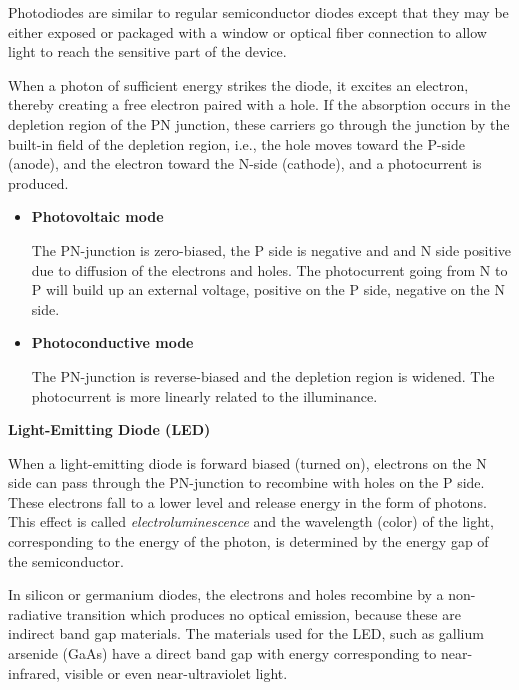 Photodiodes are similar to regular semiconductor diodes except that they 
may be either exposed or packaged with a window or optical fiber connection
to allow light to reach the sensitive part of the device. 

When a photon of sufficient energy strikes the diode, it excites an electron,
thereby creating a free electron paired with a hole. If the absorption occurs 
in the depletion region of the PN junction, these carriers go through the 
junction by the built-in field of the depletion region, i.e., the hole moves
toward the P-side (anode), and the electron toward the N-side (cathode), and
a photocurrent is produced.

\begin{itemize}
\item {\bf Photovoltaic mode}
  
  The PN-junction is zero-biased, the P side is negative and and N side positive 
  due to diffusion of the electrons and holes. The photocurrent going from N to P
  will build up an external voltage, positive on the P side, negative on the N
  side.
\item {\bf Photoconductive mode}

  The PN-junction is reverse-biased and the depletion region is widened. The 
  photocurrent is more linearly related to the illuminance.

\end{itemize} 


{\bf Light-Emitting Diode (LED)}

When a light-emitting diode is forward biased (turned on), electrons on the N side
can pass through the PN-junction to recombine with holes on the P side. These 
electrons fall to a lower level and release energy in the form of photons. This 
effect is called {\em electroluminescence} and the wavelength (color) of the light,
corresponding to the energy of the photon, is determined by the energy gap of the 
semiconductor.


In silicon or germanium diodes, the electrons and holes recombine by a non-radiative 
transition which produces no optical emission, because these are indirect band gap 
materials. The materials used for the LED, such as gallium arsenide (GaAs) have a 
direct band gap with energy corresponding to near-infrared, visible or even 
near-ultraviolet light.


